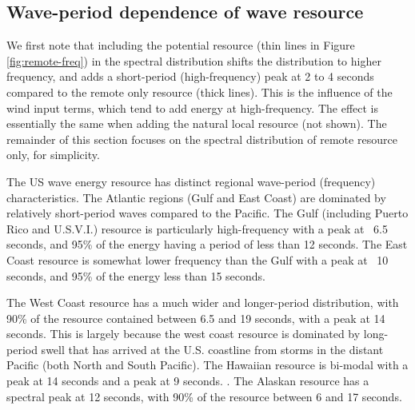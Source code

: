 \subsection{Wave-period dependence of wave resource}

We first note that including the potential resource (thin lines in Figure \ref{fig:remote-freq}) in the spectral distribution shifts the distribution to higher frequency, and adds a short-period (high-frequency) peak at 2 to 4 seconds compared to the remote only resource (thick lines). This is the influence of the wind input terms, which tend to add energy at high-frequency. The effect is essentially the same when adding the natural local resource (not shown). The remainder of this section focuses on the spectral distribution of remote resource only, for simplicity.

The US wave energy resource has distinct regional wave-period (frequency) characteristics. The Atlantic regions (Gulf and East Coast) are dominated by relatively short-period waves compared to the Pacific. The Gulf (including Puerto Rico and U.S.V.I.) resource is particularly high-frequency with a peak at ~6.5 seconds, and 95\% of the energy having a period of less than 12 seconds. The East Coast resource is somewhat lower frequency than the Gulf with a peak at ~10 seconds, and 95\% of the energy less than 15 seconds.

The West Coast resource has a much wider and longer-period distribution, with 90\% of the resource contained between 6.5 and 19 seconds, with a peak at 14 seconds. This is largely because the west coast resource is dominated by long-period swell that has arrived at the U.S. coastline from storms in the distant Pacific (both North and South Pacific). The Hawaiian resource is bi-modal with a peak at 14 seconds and a peak at 9 seconds. . The Alaskan resource has a spectral peak at 12 seconds, with 90\% of the resource between 6 and 17 seconds.

